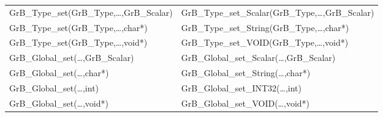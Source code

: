 \begin{table}[htb]
{\begin{tabular}{l|l}
{\sf GrB\_Type\_set(GrB\_Type,\ldots,GrB\_Scalar)}  & {\sf GrB\_Type\_set\_Scalar(GrB\_Type,\ldots,GrB\_Scalar)} \\
{\sf GrB\_Type\_set(GrB\_Type,\ldots,char*)}        & {\sf GrB\_Type\_set\_String(GrB\_Type,\ldots,char*)} \\
{\sf GrB\_Type\_set(GrB\_Type,\ldots,void*)}        & {\sf GrB\_Type\_set\_VOID(GrB\_Type,\ldots,void*)} \\
\hline

{\sf GrB\_Global\_set(\ldots,GrB\_Scalar)}  & {\sf GrB\_Global\_set\_Scalar(\ldots,GrB\_Scalar)} \\
{\sf GrB\_Global\_set(\ldots,char*)}        & {\sf GrB\_Global\_set\_String(\ldots,char*)} \\
{\sf GrB\_Global\_set(\ldots,int)}        & {\sf GrB\_Global\_set\_INT32(\ldots,int)} \\
{\sf GrB\_Global\_set(\ldots,void*)}        & {\sf GrB\_Global\_set\_VOID(\ldots,void*)} \\
\hline
\end{tabular}
}
\label{Tab:NonPolymorphic7b}
\end{table}